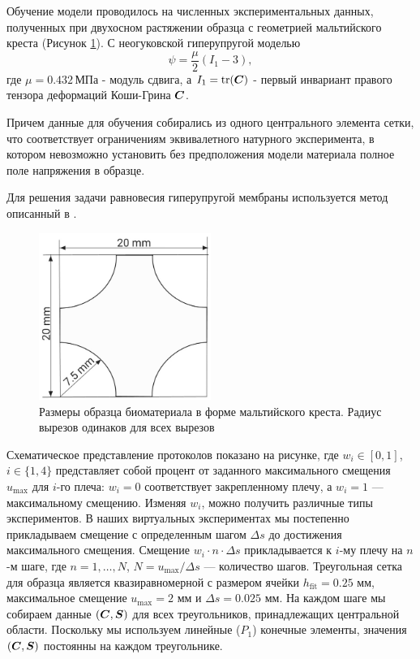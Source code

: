 Обучение модели проводилось на численных экспериментальных данных, 
полученных при двухосном растяжении образца с геометрией мальтийского креста (Рисунок \ref{fig:malt_geometry}).
С неогуковской гиперупругой моделью \cite{ogden1997nonlinear}
\begin{equation}
 \psi = \frac{\mu}{2}(I_1 - 3),
\label{eq:neo_hookean_energy}
\end{equation}
где $\mu = 0.432 \,\text{МПа}$ - модуль сдвига, а $I_1 = \text{tr}(\boldsymbol{C})$ - первый инвариант правого тензора деформаций Коши-Грина $\boldsymbol{C}$.

Причем данные для обучения собирались из одного центрального элемента сетки, что соответствует ограничениям эквивалетного 
натурного эксперимента, в котором невозможно установить без предположения модели материала полное поле напряжения в образце.

Для решения задачи равновесия гиперупругой мембраны используется метод описанный в \cite{ddaniso2024}.

\begin{figure}[H]
  \centering
  \includegraphics[width=0.5\textwidth]{img/malt_geom.png}
  \caption{Размеры образца биоматериала в форме мальтийского креста. 
  Радиус вырезов одинаков для всех вырезов}
  \label{fig:malt_geometry}
\end{figure}

Схематическое представление протоколов показано на рисунке, где $w_i \in [0,1]$, $i \in \{1,4\}$
представляет собой процент от заданного максимального смещения $u_{\max}$ для $i$-го плеча: $w_i = 0$ 
соответствует закрепленному плечу, а $w_i = 1$ — максимальному смещению. 
Изменяя $w_i$, можно получить различные типы экспериментов. В наших виртуальных экспериментах мы постепенно 
прикладываем смещение с определенным шагом $\Delta s$ до достижения максимального смещения. 
Смещение $w_i \cdot n \cdot \Delta s$ прикладывается к $i$-му плечу на $n$-м шаге, где $n = 1, \ldots, N$, 
$N = u_{\max}/\Delta s$ — количество шагов. 
Треугольная сетка для образца является квазиравномерной с размером ячейки $h_{\text{fit}} = 0.25$ мм, максимальное смещение 
$u_{\max} = 2$ мм и $\Delta s = 0.025$ мм. 
На каждом шаге мы собираем данные $(\boldsymbol{C}, \boldsymbol{S})$ для всех треугольников, принадлежащих центральной области. 
Поскольку мы используем линейные ($P_1$) конечные элементы, значения $(\boldsymbol{C}, \boldsymbol{S})$ постоянны на каждом треугольнике.

